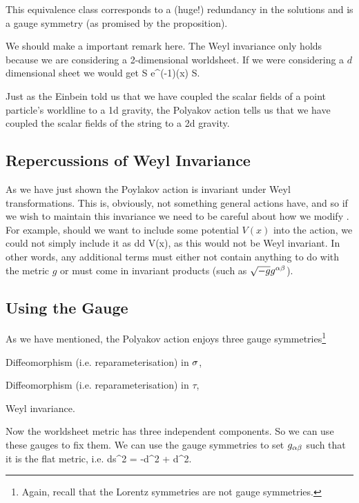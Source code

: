     This equivalence class corresponds to a (huge!) redundancy in the solutions and is a gauge symmetry (as promised by the proposition).
\eq 

\br 
    We should make a important remark here. The Weyl invariance only holds because we are considering a 2-dimensional worldsheet. If we were considering a $d$ dimensional sheet we would get
    \bse 
        S \to e^{\big(-1\big)\phi(x)} S.
    \ese 
\er 

\br 
    Just as the Einbein told us that we have coupled the scalar fields of a point particle's worldline to a 1d gravity, the Polyakov action tells us that we have coupled the scalar fields of the string to a 2d gravity. 
\er 

\subsection{Repercussions of Weyl Invariance}

As we have just shown the Poylakov action is invariant under Weyl transformations. This is, obviously, not something general actions have, and so if we wish to maintain this invariance we need to be careful about how we modify . For example, should we want to include some potential $V(x)$ into the action, we could not simply include it as 
\bse 
    \int d\sig d\tau {} V(x),
\ese 
as this would not be Weyl invariant. In other words, any additional terms must either not contain anything to do with the metric $g$ or must come in invariant products (such as $\sqrt{-g}g^{\alpha\beta}$). 

\subsection{Using the Gauge}

As we have mentioned, the Polyakov action enjoys three gauge symmetries\footnote{Again, recall that the Lorentz symmetries are not gauge symmetries.}
\ben 
    \item Diffeomorphism (i.e. reparameterisation) in $\sigma$,
    \item Diffeomorphism (i.e. reparameterisation) in $\tau$,
    \item Weyl invariance. 
\een 

Now the worldsheet metric has three independent components. So we can use these gauges to fix them. 
\bcl
    We can use the gauge symmetries to set $g_{\alpha\beta}$ such that it is the flat metric, i.e. 
    \be
    \label{eqn:FlatMetricPolyakov}
        ds^2 = -d\tau^2 + d\sig^2.
    \ee
\ecl 

